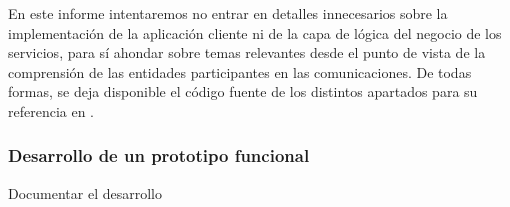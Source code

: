 En este informe intentaremos no entrar en detalles innecesarios sobre la implementación de la aplicación cliente ni de la capa de lógica del negocio de los servicios, para sí ahondar sobre temas relevantes desde el punto de vista de la comprensión de las entidades participantes en las comunicaciones. De todas formas, se deja disponible el código fuente de los distintos apartados para su referencia en .


\subsubsection{Desarrollo de un prototipo funcional}

Documentar el desarrollo
